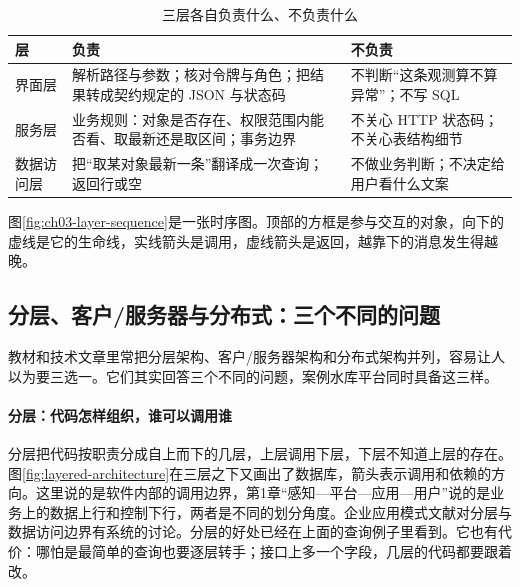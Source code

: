 \begin{table}[htbp]
\centering
\caption{三层各自负责什么、不负责什么}
\label{tab:ch03-layer-duties}
\begin{tabular}{p{2.2cm}p{5.2cm}p{5.6cm}}
\toprule
层 & 负责 & 不负责 \\
\midrule
界面层 & 解析路径与参数；核对令牌与角色；把结果转成契约规定的 JSON 与状态码 & 不判断“这条观测算不算异常”；不写 SQL \\
服务层 & 业务规则：对象是否存在、权限范围内能否看、取最新还是取区间；事务边界 & 不关心 HTTP 状态码；不关心表结构细节 \\
数据访问层 & 把“取某对象最新一条”翻译成一次查询；返回行或空 & 不做业务判断；不决定给用户看什么文案 \\
\bottomrule
\end{tabular}
\end{table}

图\ref{fig:ch03-layer-sequence}是一张时序图。顶部的方框是参与交互的对象，向下的虚线是它的生命线，实线箭头是调用，虚线箭头是返回，越靠下的消息发生得越晚。

\subsection{分层、客户/服务器与分布式：三个不同的问题}\label{sec:software-layered-architecture}

教材和技术文章里常把分层架构、客户/服务器架构和分布式架构并列，容易让人以为要三选一。它们其实回答三个不同的问题，案例水库平台同时具备这三样。

\paragraph{分层：代码怎样组织，谁可以调用谁}分层把代码按职责分成自上而下的几层，上层调用下层，下层不知道上层的存在。图\ref{fig:layered-architecture}在三层之下又画出了数据库，箭头表示调用和依赖的方向。这里说的是软件内部的调用边界，第1章“感知—平台—应用—用户”说的是业务上的数据上行和控制下行，两者是不同的划分角度。企业应用模式文献对分层与数据访问边界有系统的讨论\cite{fowler2002}。分层的好处已经在上面的查询例子里看到。它也有代价：哪怕是最简单的查询也要逐层转手；接口上多一个字段，几层的代码都要跟着改。

